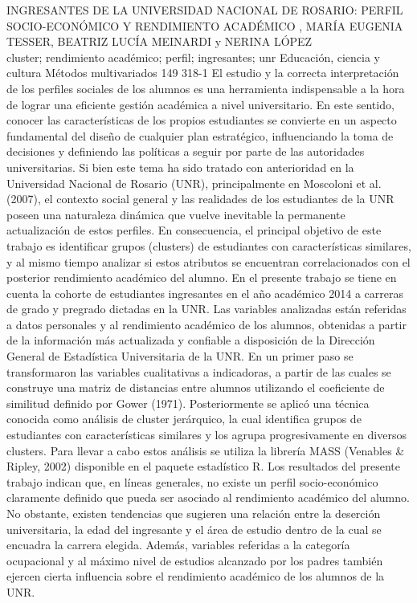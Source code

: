 \A
{INGRESANTES DE LA UNIVERSIDAD NACIONAL DE ROSARIO: PERFIL SOCIO-ECONÓMICO Y RENDIMIENTO ACADÉMICO}
{, MARÍA EUGENIA TESSER, BEATRIZ LUCÍA MEINARDI y NERINA LÓPEZ}
{
\\}
{cluster; rendimiento académico; perfil; ingresantes; unr} 
 {Educación, ciencia y cultura} 
 {Métodos multivariados} 
 {149} 
 {318-1}
{El estudio y la correcta interpretación de los perfiles sociales de los alumnos es una herramienta indispensable a la hora de lograr una eficiente gestión académica a nivel universitario. En este sentido, conocer las características de los propios estudiantes se convierte en un aspecto fundamental del diseño de cualquier plan estratégico, influenciando la toma de decisiones y definiendo las políticas a seguir por parte de las autoridades universitarias. Si bien este tema ha sido tratado con anterioridad en la Universidad Nacional de Rosario (UNR), principalmente en Moscoloni et al. (2007), el contexto social general y las realidades de los estudiantes de la UNR poseen una naturaleza dinámica que vuelve inevitable la permanente actualización de estos perfiles. En consecuencia, el principal objetivo de este trabajo es identificar grupos (clusters) de estudiantes con características similares, y al mismo tiempo analizar si estos atributos se encuentran correlacionados con el posterior rendimiento académico del alumno. En el presente trabajo se tiene en cuenta la cohorte de estudiantes ingresantes en el año académico 2014 a carreras de grado y pregrado dictadas en la UNR. Las variables analizadas están referidas a datos personales y al rendimiento académico de los alumnos, obtenidas a partir de la información más actualizada y confiable a disposición de la Dirección General de Estadística Universitaria de la UNR. En un primer paso se transformaron las variables cualitativas a indicadoras, a partir de las cuales se construye una matriz de distancias entre alumnos utilizando el coeficiente de similitud definido por Gower (1971). Posteriormente se aplicó una técnica conocida como análisis de cluster jerárquico, la cual identifica grupos de estudiantes con características similares y los agrupa progresivamente en diversos clusters. Para llevar a cabo estos análisis se utiliza la librería MASS (Venables \& Ripley, 2002) disponible en el paquete estadístico R. Los resultados del presente trabajo indican que, en líneas generales, no existe un perfil socio-económico claramente definido que pueda ser asociado al rendimiento académico del alumno. No obstante, existen tendencias que sugieren una relación entre la deserción universitaria, la edad del ingresante y el área de estudio dentro de la cual se encuadra la carrera elegida. Además, variables referidas a la categoría ocupacional y al máximo nivel de estudios alcanzado por los padres también ejercen cierta influencia sobre el rendimiento académico de los alumnos de la UNR. }
